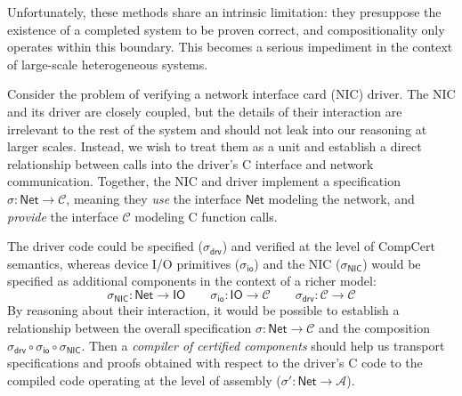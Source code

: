 \documentclass[sigplan,10pt,review]{acmart}
\newcommand{\kw}[1]{\ensuremath{ \mathsf{#1} }}
\begin{document}
Unfortunately,
these methods share an intrinsic limitation:
they presuppose the existence of a completed system
to be proven correct,
and compositionality only operates within this boundary.
This becomes a serious impediment
in the context of large-scale heterogeneous systems.


\begin{example} \label{ex:nicdriver} %
Consider the problem of verifying
a network interface card (NIC) driver.
The NIC and its driver are closely coupled,
but the details of their interaction
are irrelevant to the rest of the system
and should not leak into our reasoning at larger scales.
Instead,
we wish to treat them as a unit
and establish a direct relationship between calls into
the driver's C interface and network communication.
Together, the NIC and driver implement
a specification $\sigma :
\kw{Net} \rightarrow \mathcal{C}$,
meaning they \emph{use} the interface $\kw{Net}$
modeling the network,
and \emph{provide} the interface $\mathcal{C}$
modeling C function calls.

The driver code could be specified
($\sigma_\kw{drv}$)
and verified
at the level of CompCert semantics,
whereas device I/O primitives
($\sigma_\kw{io}$)
and the NIC
($\sigma_\kw{NIC}$)
would be specified as additional components
in the context of a richer model:
\[
  \sigma_\kw{NIC} : \kw{Net} \rightarrow \kw{IO}
  \qquad
  \sigma_\kw{io} : \kw{IO} \rightarrow \mathcal{C}
  \qquad
  \sigma_\kw{drv} : \mathcal{C} \rightarrow \mathcal{C}
\]
By reasoning about their interaction,
it would be possible to establish a relationship between
the overall specification $\sigma : \kw{Net} \rightarrow \mathcal{C}$ and
the composition
$\sigma_\kw{drv} \circ \sigma_\kw{io} \circ \sigma_\kw{NIC}$.
Then a \emph{compiler of certified components}
should help us transport specifications and proofs
obtained with respect to the driver's C code
to the compiled code operating at the level of assembly
($\sigma' : \kw{Net} \rightarrow \mathcal{A}$).
\end{example}
\end{document}
